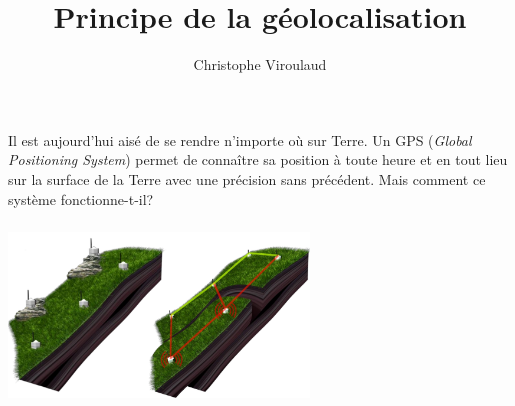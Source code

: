 \documentclass[svgnames,11pt]{beamer}
\author[]{Christophe Viroulaud}
\title{Principe de la géolocalisation}
\date{}
\institute{Seconde - SNT}
\begin{document}
\begin{frame}
    \titlepage
\end{frame}

\begin{frame}
    \frametitle{}

    Il est aujourd'hui aisé de se rendre n'importe où sur Terre. Un GPS (\emph{Global Positioning System}) permet de connaître sa position à toute heure et en tout lieu sur la surface de la Terre avec une précision sans précédent. Mais comment ce système fonctionne-t-il?


\end{frame}
\begin{frame}
    \frametitle{}

    \begin{center}
        \centering
        \includegraphics[width=8cm]{ressources/supersauze.png}
        \label{IMG}
    \end{center}

\end{frame}
\begin{frame}
    \frametitle{}

    \begin{center}
    \end{center}

\end{frame}
\end{document}
